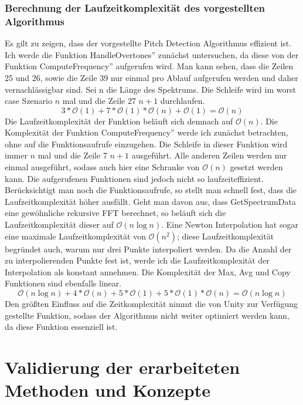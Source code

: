 \subsection*{Berechnung der Laufzeitkomplexität des vorgestellten Algorithmus}
Es gilt zu zeigen, dass der vorgestellte Pitch Detection Algorithmus effizient ist. Ich werde die Funktion \glqq HandleOvertones'' zunächst untersuchen, da diese von der Funktion \glqq ComputeFrequency'' aufgerufen wird. Man kann sehen, dass die Zeilen 25 und 26, sowie die Zeile 39 nur einmal pro Ablauf aufgerufen werden und daher vernachlässigbar sind. Sei n die Länge des Spektrums. Die Schleife wird im worst case Szenario $n$ mal und die Zeile 27 $n + 1$ durchlaufen. 
$$3 * \mathcal{O}(1) + 7 * \mathcal{O}(1) * \mathcal{O}(n) + \mathcal{O}(1) = \mathcal{O}(n) $$
Die Laufzeitkomplexität der Funktion beläuft sich demnach auf $\mathcal{O}(n)$. Die Komplexität der Funktion \glqq ComputeFrequency'' werde ich zunächst betrachten, ohne auf die Funktionsaufrufe einzugehen. Die Schleife in dieser Funktion wird immer $n$ mal und die Zeile 7 $n + 1$ ausgeführt. Alle anderen Zeilen werden nur einmal ausgeführt, sodass auch hier eine Schranke von $\mathcal{O}(n)$ gesetzt werden kann. Die aufgerufenen Funktionen sind jedoch nicht so laufzeiteffizient. Berücksichtigt man noch die Funktionsaufrufe, so stellt man schnell fest, dass die Laufzeitkomplexität höher ausfällt. Geht man davon aus, dass GetSpectrumData eine gewöhnliche rekursive FFT berechnet, so beläuft sich die Laufzeitkomplexität dieser auf $\mathcal{O}(n \log{n})$. Eine Newton Interpolation hat sogar eine maximale Laufzeitkomplexität von $\mathcal{O}(n^2)$; diese Laufzeitkomplexität begründet auch, warum nur drei Punkte interpoliert werden. Da die Anzahl der zu interpolierenden Punkte fest ist, werde ich die Laufzeitkomplexität der Interpolation als konstant annehmen. Die Komplexität der Max, Avg und Copy Funktionen sind ebenfalls linear.
$$\mathcal{O}(n \log{n}) + 4 * \mathcal{O}(n) + 5 * \mathcal{O}(1) + 5 * \mathcal{O}(1) * \mathcal{O}(n) = \mathcal{O}(n \log{n})$$
Den größten Einfluss auf die Zeitkomplexität nimmt die von Unity zur Verfügung gestellte Funktion, sodass der Algorithmus nicht weiter optimiert werden kann, da diese Funktion essenziell ist.



\chapter{Validierung der erarbeiteten Methoden und Konzepte}

